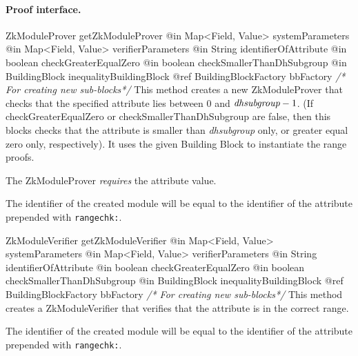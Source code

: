     \paragraph{Proof interface.}
      \begin{method}
      {ZkModuleProver}
      {getZkModuleProver}
      {
        {@in Map<Field, Value> systemParameters}
        {@in Map<Field, Value> verifierParameters}
        {@in String identifierOfAttribute}
        {@in boolean checkGreaterEqualZero}
        {@in boolean checkSmallerThanDhSubgroup}
        {@in BuildingBlock inequalityBuildingBlock}
        {@ref BuildingBlockFactory bbFactory \textrm{\emph{/* For creating new sub-blocks*/}}}
      }
      This method creates a new ZkModuleProver that checks that the specified attribute lies
      between 0 and $\emph{dhsubgroup}-1$. (If checkGreaterEqualZero or checkSmallerThanDhSubgroup are false,
      then this blocks checks that the attribute is smaller than \emph{dhsubgroup} only, or greater equal zero only, respectively).
      It uses the given Building Block to instantiate the range proofs.

      The ZkModuleProver \emph{requires} the attribute value.

      The identifier of the created module will be equal to the identifier of the attribute prepended with
      \texttt{rangechk:}.
      \end{method}
      \begin{method}
      {ZkModuleVerifier}
      {getZkModuleVerifier}
      {
        {@in Map<Field, Value> systemParameters}
        {@in Map<Field, Value> verifierParameters}
        {@in String identifierOfAttribute}
        {@in boolean checkGreaterEqualZero}
        {@in boolean checkSmallerThanDhSubgroup}
        {@in BuildingBlock inequalityBuildingBlock}
        {@ref BuildingBlockFactory bbFactory \textrm{\emph{/* For creating new sub-blocks*/}}}
      }
      This method creates a ZkModuleVerifier that verifies that the attribute is in the correct range.

      The identifier of the created module will be equal to the identifier of the attribute prepended with
      \texttt{rangechk:}.
      \end{method}
